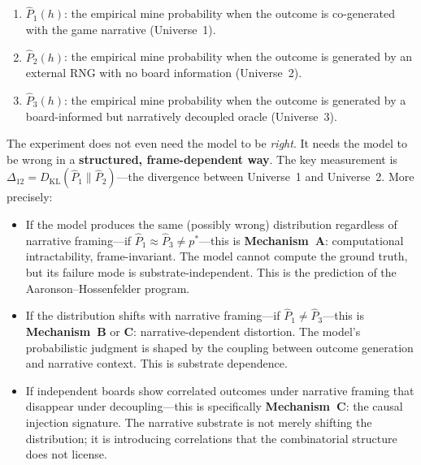 \documentclass[12pt,a4paper]{article}
\begin{document}
\begin{enumerate}[nosep]
    \item $\hat{P}_1(h)$: the empirical mine probability when the outcome is co-generated with the game narrative (Universe~1).
    \item $\hat{P}_2(h)$: the empirical mine probability when the outcome is generated by an external RNG with no board information (Universe~2).
    \item $\hat{P}_3(h)$: the empirical mine probability when the outcome is generated by a board-informed but narratively decoupled oracle (Universe~3).
\end{enumerate}

The experiment does not even need the model to be \emph{right}. It needs the model to be wrong in a \textbf{structured, frame-dependent way}. The key measurement is $\Delta_{12} = D_\mathrm{KL}(\hat{P}_1 \| \hat{P}_2)$---the divergence between Universe~1 and Universe~2. More precisely:

\begin{itemize}[nosep]
    \item If the model produces the same (possibly wrong) distribution regardless of narrative framing---if $\hat{P}_1 \approx \hat{P}_3 \neq p^*$---this is \textbf{Mechanism~A}: computational intractability, frame-invariant. The model cannot compute the ground truth, but its failure mode is substrate-independent. This is the prediction of the Aaronson--Hossenfelder program.
    \item If the distribution shifts with narrative framing---if $\hat{P}_1 \neq \hat{P}_3$---this is \textbf{Mechanism~B} or \textbf{C}: narrative-dependent distortion. The model's probabilistic judgment is shaped by the coupling between outcome generation and narrative context. This is substrate dependence.
    \item If independent boards show correlated outcomes under narrative framing that disappear under decoupling---this is specifically \textbf{Mechanism~C}: the causal injection signature. The narrative substrate is not merely shifting the distribution; it is introducing correlations that the combinatorial structure does not license.
\end{itemize}

\end{document}
